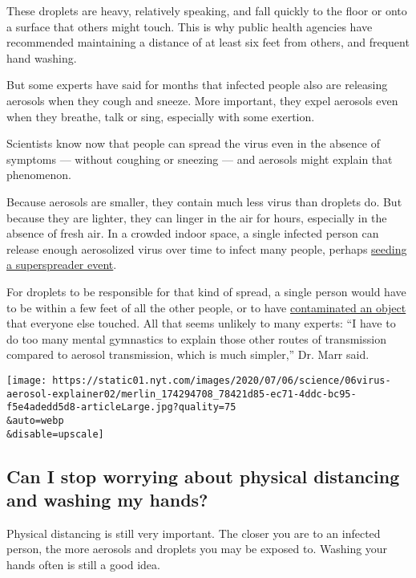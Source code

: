 These droplets are heavy, relatively speaking, and fall quickly to the
floor or onto a surface that others might touch. This is why public
health agencies have recommended maintaining a distance of at least six
feet from others, and frequent hand washing.

But some experts have said for months that infected people also are
releasing aerosols when they cough and sneeze. More important, they
expel aerosols even when they breathe, talk or sing, especially with
some exertion.

Scientists know now that people can spread the virus even in the absence
of symptoms --- without coughing or sneezing --- and aerosols might
explain that phenomenon.

Because aerosols are smaller, they contain much less virus than droplets
do. But because they are lighter, they can linger in the air for hours,
especially in the absence of fresh air. In a crowded indoor space, a
single infected person can release enough aerosolized virus over time to
infect many people, perhaps
\href{https://www.nytimes.com/2020/06/30/science/how-coronavirus-spreads.html}{seeding
a superspreader event}.

For droplets to be responsible for that kind of spread, a single person
would have to be within a few feet of all the other people, or to have
\href{https://www.nytimes.com/2020/05/28/well/live/whats-the-risk-of-catching-coronavirus-from-a-surface.html}{contaminated
an object} that everyone else touched. All that seems unlikely to many
experts: ``I have to do too many mental gymnastics to explain those
other routes of transmission compared to aerosol transmission, which is
much simpler,'' Dr. Marr said.

\texttt{[image: https://static01.nyt.com/images/2020/07/06/science/06virus-aerosol-explainer02/merlin\_174294708\_78421d85-ec71-4ddc-bc95-f5e4adedd5d8-articleLarge.jpg?quality=75\\\&auto=webp\\\&disable=upscale]}

\hypertarget{can-i-stop-worrying-about-physical-distancing-and-washing-my-hands}{%
\subsection{Can I stop worrying about physical distancing and washing my
hands?}\label{can-i-stop-worrying-about-physical-distancing-and-washing-my-hands}}

Physical distancing is still very important. The closer you are to an
infected person, the more aerosols and droplets you may be exposed to.
Washing your hands often is still a good idea.

